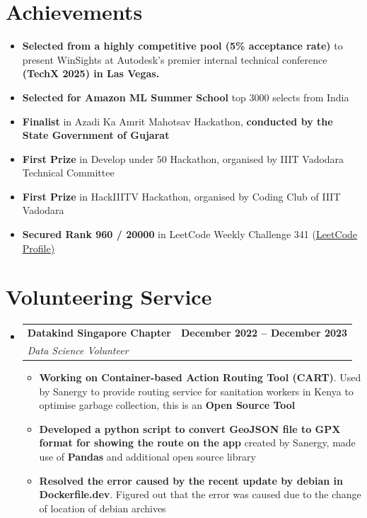 \documentclass[letterpaper,11pt]{article}
\makeatletter
\newcommand{\resumeItem}[1]{
  \item\small{
    {#1 \vspace{-2pt}}
  }
}
\newcommand{\resumeSubheading}[4]{
  \vspace{-2pt}\item
    \begin{tabular*}{1.0\textwidth}[t]{l@{\extracolsep{\fill}}r}
      \textbf{#1} & \textbf{\small #2} \\
      \textit{\small#3} & \textit{\small #4} \\
    \end{tabular*}\vspace{-7pt}
}
\newcommand{\resumeSubHeadingListStart}{\begin{itemize}[leftmargin=0.0in, label={}]}
\newcommand{\resumeSubHeadingListEnd}{\end{itemize}}
\newcommand{\resumeItemListStart}{\begin{itemize}}
\newcommand{\resumeItemListEnd}{\end{itemize}\vspace{-5pt}}
\makeatother
\begin{document}
%

\section{Achievements}
    \resumeSubHeadingListStart
        
            \resumeItemListStart
                \resumeItem{\textbf{Selected from a highly competitive pool (5\% acceptance rate)} to present WinSights at Autodesk’s premier internal technical conference \textbf{(TechX 2025) in Las Vegas.}}
                \resumeItem{\textbf{Selected for Amazon ML Summer School} top 3000 selects from India}
                \resumeItem{\textbf{Finalist} in Azadi Ka Amrit Mahotsav Hackathon, \textbf{conducted by the State Government of Gujarat}}
                \resumeItem{\textbf{First Prize} in Develop under 50 Hackathon, organised by IIIT Vadodara Technical Committee}
                \resumeItem{\textbf{First Prize} in HackIIITV Hackathon, organised by Coding Club of IIIT Vadodara}
                \resumeItem{\textbf{Secured Rank 960 / 20000} in LeetCode Weekly Challenge 341 (\href{https://leetcode.com/kalashkala/}{\underline{LeetCode Profile})}}
            \resumeItemListEnd
        
    \resumeSubHeadingListEnd

\section{Volunteering Service}

    \resumeSubHeadingListStart

        \resumeSubheading
        {Datakind Singapore Chapter}{December 2022 -- December 2023}
        {Data Science Volunteer}{}
            \resumeItemListStart
                \resumeItem{\textbf{Working on Container-based Action Routing Tool (CART)}. Used by Sanergy to provide routing service for sanitation workers in Kenya to optimise garbage collection, this is an \textbf{Open Source Tool}}
                \resumeItem{\textbf{Developed a python script to convert GeoJSON file to GPX format for showing the route on the app} created by Sanergy, made use of \textbf{Pandas} and additional open source library}
                \resumeItem{\textbf{Resolved the error caused by the recent update by debian in Dockerfile.dev}. Figured out that the error was caused due to the change of location of debian archives}
            \resumeItemListEnd

    
    \resumeSubHeadingListEnd
\end{document}
